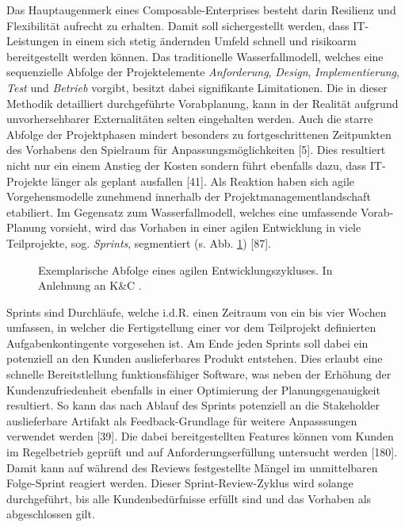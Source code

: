Das Hauptaugenmerk eines Composable-Enterprises besteht darin Resilienz und \\Flexibilität aufrecht zu erhalten. Damit soll sichergestellt werden, dass IT-Leistungen in einem sich stetig ändernden Umfeld schnell und risikoarm bereitgestellt werden können. Das traditionelle Wasserfallmodell, welches eine sequenzielle Abfolge der Projektelemente \textit{Anforderung}, \textit{Design}, \textit{Implementierung}, \textit{Test} und \textit{Betrieb} vorgibt, besitzt dabei signifikante Limitationen. Die in dieser Methodik detailliert durchgeführte Vorabplanung, kann in der Realität aufgrund unvorhersehbarer Externalitäten selten eingehalten werden. Auch die starre Abfolge der Projektphasen mindert besonders zu fortgeschrittenen Zeitpunkten des Vorhabens den Spielraum für Anpassungsmöglichkeiten \cite{Vivenzio.2013}[5]. Dies resultiert nicht nur ein einem Anstieg der Kosten sondern führt ebenfalls dazu, dass IT-Projekte länger als geplant ausfallen \cite{Vieweg.2015}[41]. Als Reaktion haben sich agile Vorgehensmodelle zunehmend innerhalb der Projektmanagementlandschaft etabiliert.
Im Gegensatz zum Wasserfallmodell, welches eine umfassende Vorab-Planung vorsieht, wird das Vorhaben in einer agilen Entwicklung in viele Teilprojekte, sog. \textit{Sprints}, segmentiert (s. Abb. \ref*{fig:Agile_Cycle}) \cite{Goll.2015}[87]. 
\begin{center}
	\begin{figure}[H]
		\centering
		\caption[Exemplarische Abfolge eines agilen Entwicklungszykluses]{Exemplarische Abfolge eines agilen Entwicklungszykluses. In Anlehnung an K\&C \cite{KUC.2021}.}
		\label{fig:Agile_Cycle}
	\end{figure}	
\end{center}
\vspace*{-15mm} Sprints sind Durchläufe, welche i.d.R. einen Zeitraum von ein bis vier Wochen umfassen, in welcher die Fertigstellung einer vor dem Teilprojekt definierten Aufgabenkontingente vorgesehen ist. Am Ende jeden Sprints soll dabei ein potenziell an den Kunden auslieferbares Produkt entstehen. Dies erlaubt eine schnelle Bereitstlellung funktionsfähiger Software, was neben der Erhöhung der Kundenzufriedenheit ebenfalls in einer Optimierung der Planungsgenauigkeit resultiert. So kann das nach Ablauf des Sprints potenziell an die Stakeholder auslieferbare Artifakt als Feedback-Grundlage für weitere Anpasssungen verwendet werden \cite{K&C.2021}[39]. 
Die dabei bereitgestellten Features können vom Kunden im Regelbetrieb geprüft und auf Anforderungserfüllung untersucht werden \cite{Gloger.2016b}[180]. Damit kann auf während des Reviews festgestellte Mängel im unmittelbaren Folge-Sprint reagiert werden. Dieser Sprint-Review-Zyklus wird solange durchgeführt, bis alle Kundenbedürfnisse erfüllt sind und das Vorhaben als abgeschlossen gilt.
